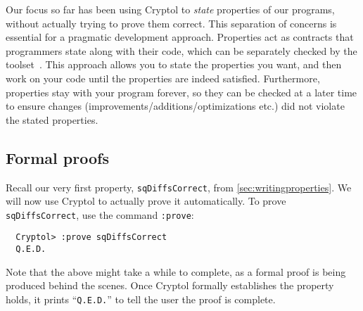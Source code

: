 
Our focus so far has been using Cryptol to \emph{state} properties of
our programs, without actually trying to prove them correct. This
separation of concerns is essential for a pragmatic development
approach.  Properties act as contracts that programmers state along
with their code, which can be separately checked by the
toolset~\cite{erkok-matthews-cryptolEqChecking-09}.  This approach
allows you to state the properties you want, and then work on your
code until the properties are indeed satisfied. Furthermore,
properties stay with your program forever, so they can be checked at a
later time to ensure changes (improvements/additions/optimizations
etc.) did not violate the stated properties.

\subsection{Formal proofs}
\label{sec:formal-proofs}

Recall our very first property, {\tt sqDiffsCorrect}, from
\autoref{sec:writingproperties}. We will now use Cryptol to
actually prove it automatically.  To prove {\tt sqDiffsCorrect}, use
the command {\tt :prove}:\indCmdProve
\begin{Verbatim}
  Cryptol> :prove sqDiffsCorrect
  Q.E.D.
\end{Verbatim}
Note that the above might take a while to complete, as a formal proof
is being produced behind the scenes.  Once Cryptol formally
establishes the property holds, it prints ``{\tt Q.E.D.}'' to tell the
user the proof is complete.\indQED\indProve

